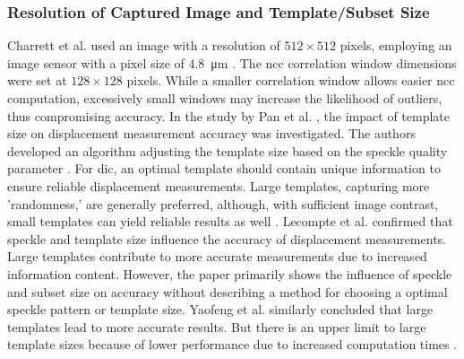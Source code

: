     \subsubsection{Resolution of Captured Image and Template/Subset Size}\label{subsubsection:template_size}
    Charrett et al. used an image with a resolution of \(512 \times 512\) pixels, employing an image sensor with a pixel size of \SI{4.8}{\micro\meter} \cite{charrett_2018}. The \gls{ncc} correlation window dimensions were set at \(128 \times 128\) pixels. While a smaller correlation window allows easier \gls{ncc} computation, excessively small windows may increase the likelihood of outliers, thus compromising accuracy. In the study by Pan et al. \cite{pan_subset}, the impact of template size on displacement measurement accuracy was investigated. The authors developed an algorithm adjusting the template size based on the speckle quality parameter . For \gls{dic}, an optimal template should contain unique information to ensure reliable displacement measurements. Large templates, capturing more 'randomness,' are generally preferred, although, with sufficient image contrast, small templates can yield reliable results as well \cite{pan_subset}. Lecompte et al. \cite{lecompte} confirmed that speckle and template size influence the accuracy of displacement measurements. Large templates contribute to more accurate measurements due to increased information content. However, the paper primarily shows the influence of speckle and subset size on accuracy without describing a method for choosing a optimal speckle pattern or template size. Yaofeng et al. similarly concluded that large templates lead to more accurate results. But there is an upper limit to large template sizes because of lower performance due to increased computation times \cite{yaofeng}.

